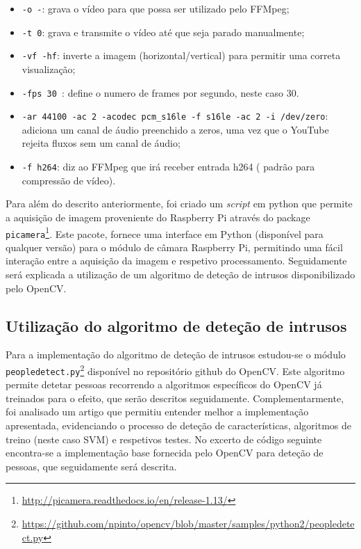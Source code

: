 \begin{itemize}
	\item \texttt{-o -}: grava o vídeo para que possa ser utilizado pelo FFMpeg; 
	
	\item \texttt{-t 0}: grava e transmite o vídeo até que seja parado manualmente; 
	
	\item \texttt{-vf -hf}: inverte a imagem (horizontal/vertical) para permitir uma correta visualização; 
	
	\item \texttt{-fps 30 }: define o numero de frames por segundo, neste caso 30. 
	
	\item \texttt{-ar 44100 -ac 2 -acodec pcm\_s16le -f s16le -ac 2 -i /dev/zero}: adiciona um canal de áudio preenchido a zeros, uma vez que o YouTube rejeita fluxos sem um canal de áudio; 
	
	\item \texttt{-f h264}: diz ao FFMpeg que irá receber entrada h264 ( padrão para compressão de vídeo). 
	
\end{itemize}






Para além do descrito anteriormente, foi criado um \textit{script} em python que permite a aquisição de imagem proveniente do Raspberry Pi através do package \texttt{picamera}\footnote{\url{http://picamera.readthedocs.io/en/release-1.13/}}. Este pacote, fornece  uma interface em Python (disponível para qualquer versão) para o módulo de câmara Raspberry Pi, permitindo uma fácil interação entre a aquisição da imagem e respetivo processamento.
Seguidamente será explicada a utilização de um algoritmo de deteção de intrusos disponibilizado pelo OpenCV. 


 


\subsection{Utilização do algoritmo de deteção de intrusos}
\label{algdetecao}


Para a implementação do algoritmo de deteção de intrusos estudou-se o módulo \linebreak \texttt{peopledetect.py}\footnote{\url{https://github.com/npinto/opencv/blob/master/samples/python2/peopledetect.py}} disponível no repositório github do OpenCV. Este algoritmo permite detetar pessoas recorrendo a algoritmos específicos do OpenCV já treinados para o efeito, que serão descritos seguidamente. Complementarmente, foi analisado um artigo\cite{Dalal} que permitiu entender melhor a implementação apresentada, evidenciando o processo de deteção de características, algoritmos de treino (neste caso \ac{SVM}) e respetivos testes. No excerto de código seguinte encontra-se a implementação base fornecida pelo OpenCV para deteção de pessoas, que seguidamente será descrita. 


